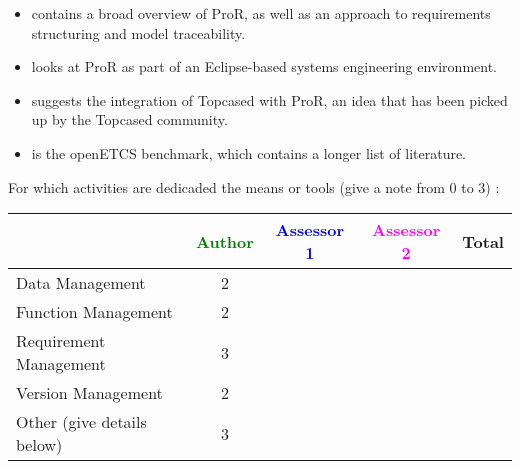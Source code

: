 \begin{itemize}

\item \cite{RMF_Mark_Book_Jastram_2013} contains a broad overview of ProR, as well as an approach to requirements structuring and model traceability.

\item \cite{jastram_forms_2012} looks at ProR as part of an Eclipse-based systems engineering environment.

\item \cite{topcase-JaGr2011} suggests the integration of Topcased with ProR, an idea that has been picked up by the Topcased community.

\item \cite{pror-benchmark} is the openETCS benchmark, which contains a longer list of literature.

\end{itemize}

For which activities are dedicaded the means or tools (give a note from 0 to  3) :

\begin{tabular}{|l | c | c | c | c|}
\hline
& \textcolor{green}{Author} & \textcolor{blue}{Assessor 1} & \textcolor{magenta}{Assessor 2} & Total \\
\hline 
Data Management & 2 & & &  \\
\hline
Function Management & 2 & & & \\
\hline
Requirement Management & 3 & & & \\
\hline
Version Management & 2 & & & \\
\hline
Other (give details below) & 3 & & & \\
\hline
\end{tabular}

